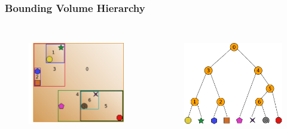 \documentclass{beamer}
\begin{document}
\begin{frame}
  \frametitle{Bounding Volume Hierarchy}
  
\begin{columns}[t]

\begin{figure}
\includegraphics[height=45mm]{primitive-box-tall.png}
\end{figure}

\begin{figure}
\includegraphics[height=45mm]{primitive_tree_narrow.png}
\end{figure}
\end{columns}
\end{frame}
\end{document}
